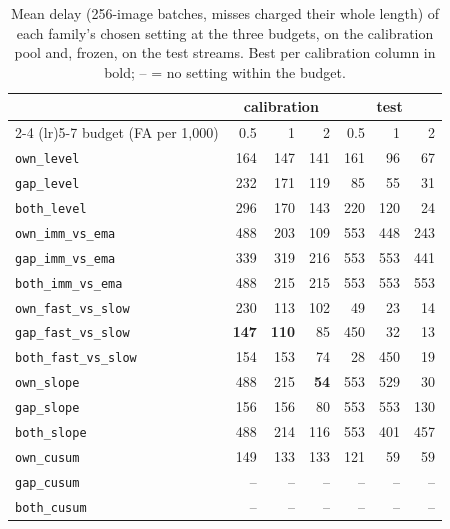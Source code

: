 \documentclass[10pt]{article}
\newcommand{\rl}[1]{\texttt{#1}}
\begin{document}
\begin{table}[ht]
  \centering\small
  \caption{Mean delay (256-image batches, misses charged their whole length) of each family's chosen setting at the three budgets, on the calibration pool and, frozen, on the test streams. Best per calibration column in bold; -- = no setting within the budget.}
  \label{tab:bud}
  \begin{tabular}{lrrrrrr}
    \toprule
    & \multicolumn{3}{c}{calibration} & \multicolumn{3}{c}{test} \\
    \cmidrule(lr){2-4} \cmidrule(lr){5-7}
    budget (FA per 1,000) & 0.5 & 1 & 2 & 0.5 & 1 & 2 \\
    \midrule
    \rl{own\_level} & 164 & 147 & 141 & 161 & 96 & 67 \\
    \rl{gap\_level} & 232 & 171 & 119 & 85 & 55 & 31 \\
    \rl{both\_level} & 296 & 170 & 143 & 220 & 120 & 24 \\
    \addlinespace
    \rl{own\_imm\_vs\_ema} & 488 & 203 & 109 & 553 & 448 & 243 \\
    \rl{gap\_imm\_vs\_ema} & 339 & 319 & 216 & 553 & 553 & 441 \\
    \rl{both\_imm\_vs\_ema} & 488 & 215 & 215 & 553 & 553 & 553 \\
    \addlinespace
    \rl{own\_fast\_vs\_slow} & 230 & 113 & 102 & 49 & 23 & 14 \\
    \rl{gap\_fast\_vs\_slow} & \textbf{147} & \textbf{110} & 85 & 450 & 32 & 13 \\
    \rl{both\_fast\_vs\_slow} & 154 & 153 & 74 & 28 & 450 & 19 \\
    \addlinespace
    \rl{own\_slope} & 488 & 215 & \textbf{54} & 553 & 529 & 30 \\
    \rl{gap\_slope} & 156 & 156 & 80 & 553 & 553 & 130 \\
    \rl{both\_slope} & 488 & 214 & 116 & 553 & 401 & 457 \\
    \addlinespace
    \rl{own\_cusum} & 149 & 133 & 133 & 121 & 59 & 59 \\
    \rl{gap\_cusum} & -- & -- & -- & -- & -- & -- \\
    \rl{both\_cusum} & -- & -- & -- & -- & -- & -- \\
    \bottomrule
  \end{tabular}
\end{table}
\end{document}
